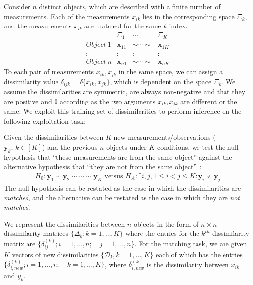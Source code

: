 \documentclass[12pt,oneside,final]{thesis}\usepackage[]{graphicx}\usepackage[]{color}
\begin{document}
Consider $n$  distinct objects, which are described with a finite number of measurements. Each of the measurements $x_{ik}$ lies in  the corresponding space $\Xi_k$, and the  measurements $x_{ik}$ are matched for the same $k$ index.
\[  \begin{array}{cccc}
        & \Xi_1 & \cdots & \Xi_K\\
        Object ~ 1 & \bm{x}_{11} & \sim \cdots \sim & \bm{x}_{1K} \\
        \vdots & \vdots & \vdots & \vdots \\
        Object ~ n & \bm{x}_{n1} & \sim \cdots \sim & \bm{x}_{nK}
      \end{array}      
\]
To each pair of measurements $x_{ik},x_{jk}$ in the same space, we can assign a dissimilarity value $\delta_{ijk}=\delta\{x_{ik},x_{jk}\}$, which is  dependent on the space $\Xi_k$. We assume the dissimilarities are symmetric, are always non-negative and that they are positive and 0 according as  the two arguments $x_{ik},x_{jk}$ are different or the same.
%
We exploit this training set of  dissimilarities to perform inference on the following exploitation task:

 Given the dissimilarities between  $K$ new measurements/observations ($\bm{y}_{k};\, k \in [K]$) and the previous $n$ objects under $K$ conditions, 
we test the null hypothesis  that ``these measurements are from the same  object''  against the alternative hypothesis that ``they are not  from the same  object''~\cite{JOFC}:
    \[
\begin{array}{l}
    H_0: \bm{y}_{1} \sim \bm{y}_{2} \sim \cdots \sim \bm{y}_{K}
 \text{ versus } 
 H_A: \exists i, j , 1\leq i < j \leq K :\bm{y}_{i} \nsim \bm{y}_{j}  
\end{array}
\]
 The null hypothesis can be restated as the case in which the dissimilarities are \emph{matched}, and the alternative can be restated as the case in which they are \emph{not matched}.

We represent the dissimilarities between $n$ objects in the form  of $n \times n$  dissimilarity matrices $\{\Delta_k;k=1,\ldots,K\}$ where the entries for the $k^{th}$ dissimilarity matrix are $\{\delta^{(k)}_{ij} ;  i=1,\ldots,n;\quad j=1,\ldots,n\}$. For the matching task, we are given $K$  vectors of new dissimilarities  $\{\mathcal{D}_k,k=1 ,\ldots,K\}$ each of which has the entries $\{ \delta_{i,new}^{(k)}; i=1,\ldots, n;\quad k=1,\ldots,K\}  $,  where $\delta_{i,new}^{(k)}$ is the dissimilarity  between  $x_{ik}$ and $y_k$.
 
\end{document}
